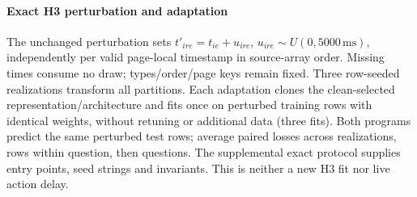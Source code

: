 \paragraph{Exact H3 perturbation and adaptation}
The unchanged perturbation sets $t'_{ire}=t_{ie}+u_{ire}$, $u_{ire}\sim U(0,5000\,\mathrm{ms})$, independently per valid page-local timestamp in source-array order. Missing times consume no draw; types/order/page keys remain fixed. Three row-seeded realizations transform all partitions. Each adaptation clones the clean-selected representation/architecture and fits once on perturbed training rows with identical weights, without retuning or additional data (three fits). Both programs predict the same perturbed test rows; average paired losses across realizations, rows within question, then questions. The supplemental exact protocol supplies entry points, seed strings and invariants. This is neither a new H3 fit nor live action delay.
